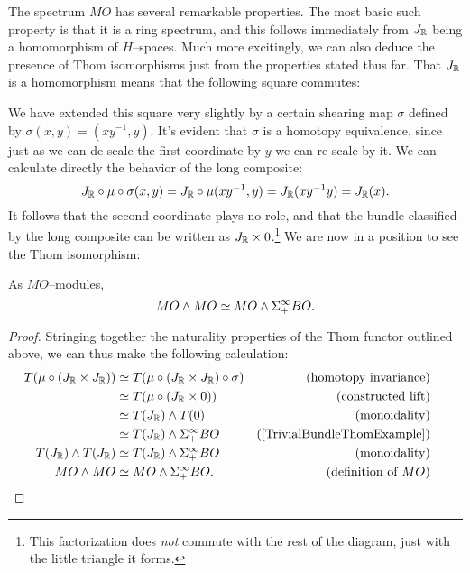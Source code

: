 The spectrum $MO$ has several remarkable properties.  The most basic such property is that it is a ring spectrum, and this follows immediately from $J_{\mathbb R}$ being a homomorphism of $H$--spaces.  Much more excitingly, we can also deduce the presence of Thom isomorphisms just from the properties stated thus far.  That $J_{\mathbb R}$ is a homomorphism means that the following square commutes:
\begin{center}
\end{center}
We have extended this square very slightly by a certain shearing map $\sigma$ defined by $\sigma(x, y) = (xy^{-1}, y)$.  It's evident that $\sigma$ is a homotopy equivalence, since just as we can de-scale the first coordinate by $y$ we can re-scale by it.  We can calculate directly the behavior of the long composite: \[J_{\mathbb R} \circ \mu \circ \sigma(x, y) = J_{\mathbb R} \circ \mu(xy^{-1}, y) = J_{\mathbb R}(xy^{-1}y) = J_{\mathbb R}(x).\]  It follows that the second coordinate plays no role, and that the bundle classified by the long composite can be written as $J_{\mathbb R} \times 0$.\footnote{This factorization does \emph{not} commute with the rest of the diagram, just with the little triangle it forms.}  We are now in a position to see the Thom isomorphism:
\begin{lemma} As $MO$--modules, \[MO \wedge MO \simeq MO \wedge \Sigma^\infty_+ BO.\]
\end{lemma}
\begin{proof}
Stringing together the naturality properties of the Thom functor outlined above, we can thus make the following calculation:
\begin{align*}
T(\mu \circ (J_{\R} \times J_{\R})) & \simeq T(\mu \circ (J_{\R} \times J_{\R}) \circ \sigma) & \text{(homotopy invariance)} \\
& \simeq T(\mu \circ (J_{\R} \times 0)) & \text{(constructed lift)} \\
& \simeq T(J_{\R}) \sm T(0) & \text{(monoidality)} \\
& \simeq T(J_{\R}) \sm \Susp^\infty_+ BO & \text{(\Cref{TrivialBundleThomExample})} \\
T(J_{\R}) \sm T(J_{\R}) & \simeq T(J_{\R}) \sm \Susp^\infty_+ BO & \text{(monoidality)} \\
MO \sm MO & \simeq MO \sm \Susp^\infty_+ BO. & \text{(definition of $MO$)} & \phantom{.} \qedhere
\end{align*}
\end{proof}

